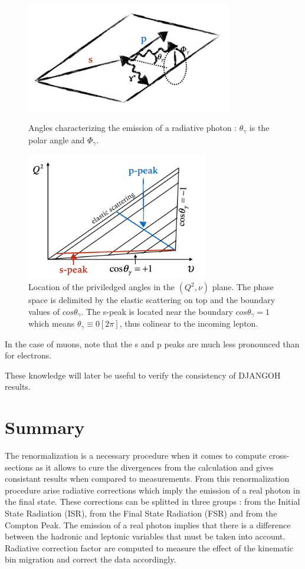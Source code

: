\begin{figure}[hbt]
\parbox{8cm}{
\includegraphics[width=9cm]{gfx/plan_angle.png}
\caption{Angles characterizing the emission of a radiative photon : $\theta_\gamma$ is the polar angle and $\Phi_\gamma$.}
\label{fig:plan}}
\qquad
\begin{minipage}{8cm}
\includegraphics[width=8cm]{gfx/peaks.png}
\caption{Location of the priviledged angles in the $(Q^2,\nu)$ plane. The phase space is delimited by the elastic scattering
on top and the boundary values of $cos\theta_\gamma$. The s-peak is located near the boundary $cos\theta_\gamma=1$ which means
$\theta_\gamma \equiv 0[2\pi]$, thus colinear to the incoming lepton.}
\label{fig:peaks}
\end{minipage}
\end{figure}

In the case of muons, note that the s and p peaks are much less pronounced than for electrons.

These knowledge will later be useful to verify the consistency of DJANGOH results.

\newpage


\section{Summary}

The renormalization is a necessary procedure when it comes to compute cross-sections as it allows to cure the divergences from the calculation and gives consistant results when compared to measurements. From this renormalization procedure arise radiative corrections which imply the emission of a real photon in the final state. These corrections can be splitted in three groups : from the Initial State Radiation (ISR), from the Final State Radiation (FSR) and from the Compton Peak. The emission of a real photon implies that there is a difference between the hadronic and leptonic variables that must be taken into account. Radiative correction factor are computed to measure the effect of the kinematic bin migration and correct the data accordingly.
